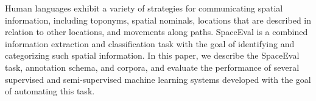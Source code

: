 Human languages exhibit a variety of strategies for communicating spatial information, including toponyms, spatial nominals, locations that are described in relation to other locations, and movements along paths. SpaceEval is a combined information extraction and classification task with the goal of identifying and categorizing such spatial information. In this paper, we describe the SpaceEval task, annotation schema, and corpora, and evaluate the performance of several supervised and semi-supervised machine learning systems developed with the goal of automating this task.
